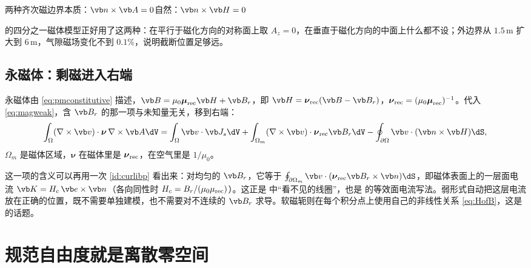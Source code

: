 \begin{compare}{两种齐次磁边界}{本质：$\vb n\times\vb A=0$}{自然：$\vb n\times\vb H=0$}
\end{compare}

 的四分之一磁体模型正好用了这两种：在平行于磁化方向的对称面上取 $A_z=0$，在垂直于磁化方向的中面上什么都不设；外边界从 $1.5\,\mathrm m$ 扩大到 $6\,\mathrm m$，气隙磁场变化不到 $0.1\%$，说明截断位置足够远。

\subsection{永磁体：剩磁进入右端}
永磁体由 \eqref{eq:pmconstitutive} 描述，$\vb B=\mu_0\boldsymbol\mu_{\rm rec}\vb H+\vb B_r$，即 $\vb H=\boldsymbol\nu_{\rm rec}(\vb B-\vb B_r)$，$\boldsymbol\nu_{\rm rec}=(\mu_0\boldsymbol\mu_{\rm rec})^{-1}$。代入 \eqref{eq:magweak}，含 $\vb B_r$ 的那一项与未知量无关，移到右端：
\begin{equation}
\int_\Omega(\nabla\times\vb v)\cdot\boldsymbol\nu\,\nabla\times\vb A\dV
=\int_\Omega\vb v\cdot\vb J_s\dV
+\int_{\Omega_m}(\nabla\times\vb v)\cdot\boldsymbol\nu_{\rm rec}\vb B_r\dV
-\oint_{\partial\Omega}\vb v\cdot(\vb n\times\vb H)\dS ,
\label{eq:femvector-pm}
\end{equation}
$\Omega_m$ 是磁体区域，$\boldsymbol\nu$ 在磁体里是 $\boldsymbol\nu_{\rm rec}$，在空气里是 $1/\mu_0$。

这一项的含义可以再用一次 \eqref{id:curlibp} 看出来：对均匀的 $\vb B_r$，它等于 $\oint_{\partial\Omega_m}\vb v\cdot(\boldsymbol\nu_{\rm rec}\vb B_r\times\vb n)\dS$，即磁体表面上的一层面电流 $\vb K=H_c\,\vb e\times\vb n$（各向同性时 $H_c=B_r/(\mu_0\mu_{\rm rec})$）。这正是 中“看不见的线圈”，也是 的等效面电流写法。弱形式自动把这层电流放在正确的位置，既不需要单独建模，也不需要对不连续的 $\vb B_r$ 求导。软磁轭则在每个积分点上使用自己的非线性关系 \eqref{eq:HofB}，这是 的话题。

\section{规范自由度就是离散零空间}\label{sec:femvector-gauge}

